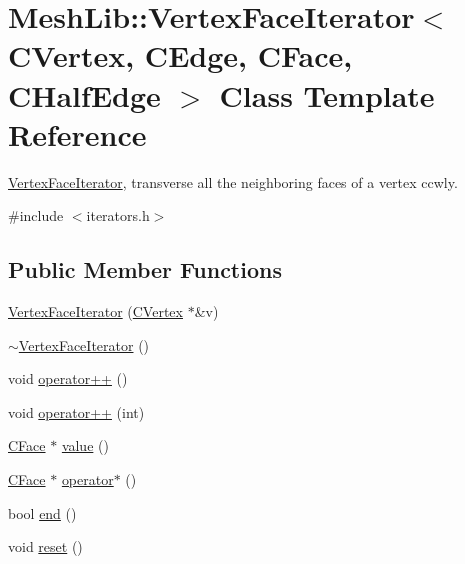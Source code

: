 \hypertarget{class_mesh_lib_1_1_vertex_face_iterator}{}\section{Mesh\+Lib\+:\+:Vertex\+Face\+Iterator$<$ C\+Vertex, C\+Edge, C\+Face, C\+Half\+Edge $>$ Class Template Reference}
\label{class_mesh_lib_1_1_vertex_face_iterator}


\hyperlink{class_mesh_lib_1_1_vertex_face_iterator}{Vertex\+Face\+Iterator}, transverse all the neighboring faces of a vertex ccwly.  




{\ttfamily \#include $<$iterators.\+h$>$}

\subsection*{Public Member Functions}
\begin{DoxyCompactItemize}
\item 
\hyperlink{class_mesh_lib_1_1_vertex_face_iterator_a355f4d9fc46db14c57ce5ebf65fbc762}{Vertex\+Face\+Iterator} (\hyperlink{class_mesh_lib_1_1_c_vertex}{C\+Vertex} $\ast$\&v)
\item 
\hyperlink{class_mesh_lib_1_1_vertex_face_iterator_af4689d218bce4b432802b423e3fc7309}{$\sim$\+Vertex\+Face\+Iterator} ()
\item 
void \hyperlink{class_mesh_lib_1_1_vertex_face_iterator_a0a007ec8fcc93e8f8ecddd965e1cadec}{operator++} ()
\item 
void \hyperlink{class_mesh_lib_1_1_vertex_face_iterator_a86fae116abe020285333149ce8c5f815}{operator++} (int)
\item 
\hyperlink{class_mesh_lib_1_1_c_face}{C\+Face} $\ast$ \hyperlink{class_mesh_lib_1_1_vertex_face_iterator_a74123b44fb9279dd655cb9aa49b23162}{value} ()
\item 
\hyperlink{class_mesh_lib_1_1_c_face}{C\+Face} $\ast$ \hyperlink{class_mesh_lib_1_1_vertex_face_iterator_adda96e80e1f73dbf83b80ce798a20c3e}{operator$\ast$} ()
\item 
bool \hyperlink{class_mesh_lib_1_1_vertex_face_iterator_a764351e1409276033732a93db3063ead}{end} ()
\item 
void \hyperlink{class_mesh_lib_1_1_vertex_face_iterator_aca0206c81be50cfa8afbaf72d5ab9e28}{reset} ()
\end{DoxyCompactItemize}



